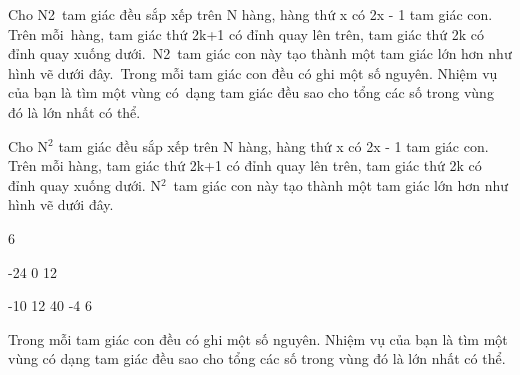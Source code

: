 Cho N2 tam giác đều sắp xếp trên N hàng, hàng thứ x có 2x - 1 tam giác con. Trên mỗi hàng, tam giác thứ 2k+1 có đỉnh quay lên trên, tam giác thứ 2k có đỉnh quay xuống dưới. N2 tam giác con này tạo thành một tam giác lớn hơn như hình vẽ dưới đây. Trong mỗi tam giác con đều có ghi một số nguyên. Nhiệm vụ của bạn là tìm một vùng có dạng tam giác đều sao cho tổng các số trong vùng đó là lớn nhất có thể. 

Cho N$^2$ tam giác đều sắp xếp trên N hàng, hàng thứ x có 2x - 1 tam giác con. Trên mỗi hàng, tam giác thứ 2k+1 có đỉnh quay lên trên, tam giác thứ 2k có đỉnh quay xuống dưới. N$^2$ tam giác con này tạo thành một tam giác lớn hơn như hình vẽ dưới đây. 

6

-24 0 12

-10 12 40 -4 6

Trong mỗi tam giác con đều có ghi một số nguyên. Nhiệm vụ của bạn là tìm một vùng có dạng tam giác đều sao cho tổng các số trong vùng đó là lớn nhất có thể.